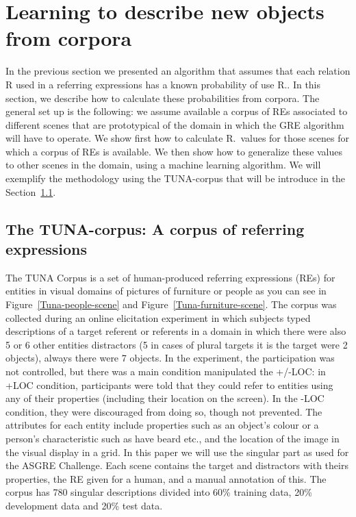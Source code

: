 \section{Learning to describe new objects from corpora}
\label{sec:learning}

In the previous section we presented an algorithm that assumes that each relation R 
used in a referring expressions has a known probability of use R.\puse. In this section, 
we describe how to calculate these probabilities from corpora.  
The general set up is the following: we assume available a corpus of REs associated 
to different scenes that are prototypical of the domain in which the GRE algorithm will have to operate.   
We show first how to calculate R.\puse\ values for those scenes for which a corpus of REs is available.  
We then show how to generalize these values to 
other scenes in the domain, using a machine learning algorithm. We will exemplify the methodology using 
the TUNA-corpus that will be introduce in the Section~\ref{sec:tuna}.

\subsection{The TUNA-corpus: A corpus of referring expressions}
\label{sec:tuna}
The TUNA Corpus is a set of human-produced referring expressions (REs) for entities in visual domains of
pictures of furniture or people as you can see in Figure~\ref{Tuna-people-scene} and Figure~\ref{Tuna-furniture-scene}. The corpus was
collected during an online elicitation experiment in
which subjects typed descriptions of a target referent or referents
in a domain in which there were also 5 or 6 other entities distractors (5 in cases of plural targets it is the target were 2 objects), always there were 7 objects. In the experiment, the participation was not controlled, but there was a main condition manipulated the +/-LOC: in +LOC condition, participants were told that they could refer to entities using any of their properties (including their location on the screen). In the -LOC condition, they were discouraged from doing so, though not prevented. 
The attributes for each entity include properties such as an object's colour or a person's characteristic such as have beard etc., and the location of the image in the visual display in a grid.
In this paper we will use the singular part as used for the ASGRE Challenge. Each scene contains the target and distractors with theirs properties, the RE given for a human, and a manual annotation of this.   
The corpus has 780 singular descriptions divided
into 60\% training data, 20\% development data and
20\% test data. 

